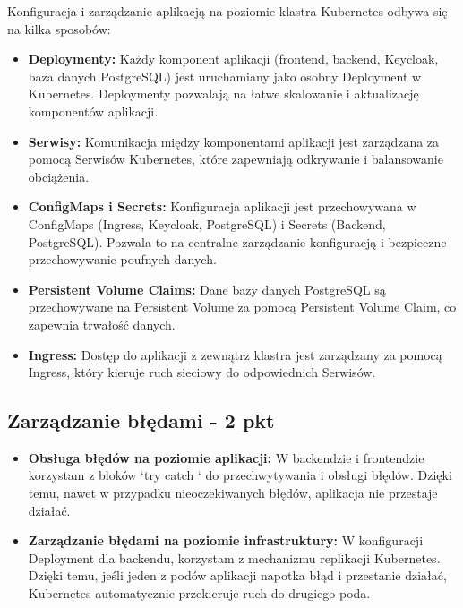 \documentclass[12pt,a4paper]{article}
\begin{document}
Konfiguracja i zarządzanie aplikacją na poziomie klastra Kubernetes odbywa się na kilka sposobów:

\begin{itemize}
\item \textbf{Deploymenty:} Każdy komponent aplikacji (frontend, backend, Keycloak, baza danych PostgreSQL) jest uruchamiany jako osobny Deployment w Kubernetes. Deploymenty pozwalają na łatwe skalowanie i aktualizację komponentów aplikacji.

\item \textbf{Serwisy:} Komunikacja między komponentami aplikacji jest zarządzana za pomocą Serwisów Kubernetes, które zapewniają odkrywanie i balansowanie obciążenia.

\item \textbf{ConfigMaps i Secrets:} Konfiguracja aplikacji jest przechowywana w ConfigMaps (Ingress, Keycloak, PostgreSQL) i Secrets (Backend, PostgreSQL). Pozwala to na centralne zarządzanie konfiguracją i bezpieczne przechowywanie poufnych danych.

\item \textbf{Persistent Volume Claims:} Dane bazy danych PostgreSQL są przechowywane na Persistent Volume za pomocą Persistent Volume Claim, co zapewnia trwałość danych.

\item \textbf{Ingress:} Dostęp do aplikacji z zewnątrz klastra jest zarządzany za pomocą Ingress, który kieruje ruch sieciowy do odpowiednich Serwisów.
\end{itemize}

\subsection{Zarządzanie błędami - 2 pkt}
\label{sec:ERD} 

\begin{itemize}
\item \textbf{Obsługa błędów na poziomie aplikacji:} W backendzie i frontendzie korzystam z bloków `try {} catch {}` do przechwytywania i obsługi błędów. Dzięki temu, nawet w przypadku nieoczekiwanych błędów, aplikacja nie przestaje działać.
\item \textbf{Zarządzanie błędami na poziomie infrastruktury:} W konfiguracji Deployment dla backendu, korzystam z mechanizmu replikacji Kubernetes. Dzięki temu, jeśli jeden z podów aplikacji napotka błąd i przestanie działać, Kubernetes automatycznie przekieruje ruch do drugiego poda.

\end{itemize}
\end{document}
